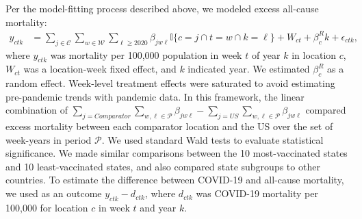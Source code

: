 \documentclass[
]{article}
\begin{document}
Per the model-fitting process described above, we modeled excess
all-cause mortality: \begin{align*}
y_{ctk} &= \sum_{j \in \mathcal{C}} \sum_{w \in \mathcal{W}} \sum_{\ell \geq 2020} \beta_{jw\ell} \mathbb{I}\{c=j \cap t = w \cap k = \ell\} + {W}_{ct} + \beta_c^R k + \epsilon_{ctk},
\end{align*} where \(y_{ctk}\) was mortality per 100,000 population in
week \(t\) of year \(k\) in location \(c\), \({W}_{ct}\) was a
location-week fixed effect, and \(k\) indicated year. We estimated
\(\beta_c^R\) as a random effect. Week-level treatment effects were
saturated to avoid estimating pre-pandemic trends with pandemic data. In
this framework, the linear combination of
\(\sum_{j = Comparator} \sum_{w,\ell \in \mathcal{P}} \beta_{j w \ell} - \sum_{j = US} \sum_{w, \ell \in \mathcal{P}} \beta_{jw\ell}\)
compared excess mortality between each comparator location and the US
over the set of week-years in period \(\mathcal{P}\). We used standard
Wald tests to evaluate statistical significance. We made similar
comparisons between the 10 most-vaccinated states and 10
least-vaccinated states, and also compared state subgroups to other
countries. To estimate the difference between COVID-19 and all-cause
mortality, we used as an outcome \(y_{ctk} - d_{ctk}\), where
\(d_{ctk}\) was COVID-19 mortality per 100,000 for location \(c\) in
week \(t\) and year \(k\).
\end{document}
